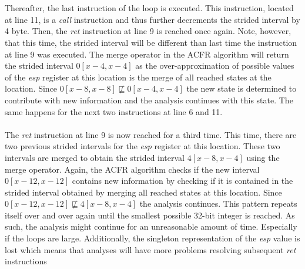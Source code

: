 \documentclass{kththesis}
\renewcommand{\it}[1]{\textit{#1}}
\begin{document}
\\ \\
Thereafter, the last instruction of the loop is executed. This instruction, located at line 11, is a \it{call} instruction and thus further decrements the strided interval by 4 byte. Then, the \it{ret} instruction at line 9 is reached once again. Note, however, that this time, the strided interval will be different than last time the instruction at line 9 was executed. The merge operator in the ACFR algorithm will return the strided interval $0[x-4,x-4]$ as the over-approximation of possible values of the \it{esp} register at this location is the merge of all reached states at the location. Since $0[x-8,x-8] \nsqsubseteq 0[x-4,x-4]$ the new state is determined to contribute with new information and the analysis continues with this state. The same happens for the next two instructions at line 6 and 11.
\\ \\
The \it{ret} instruction at line 9 is now reached for a third time. This time, there are two previous strided intervals for the \it{esp} register at this location. These two intervals are merged to obtain the strided interval $4[x-8,x-4]$ using the merge operator. Again, the ACFR algorithm checks if the new interval $0[x-12,x-12]$ contains new information by checking if it is contained in the strided interval obtained by merging all reached states at this location. Since $0[x-12,x-12] \nsqsubseteq 4[x-8,x-4]$ the analysis continues.
\clearpage
\noindent
This pattern repeats itself over and over again until the smallest possible 32-bit integer is reached. As such, the analysis might continue for an unreasonable amount of time. Especially if the loops are large. Additionally, the singleton representation of the \it{esp} value is lost which means that analyses will have more problems resolving subsequent \it{ret} instructions
\end{document}
